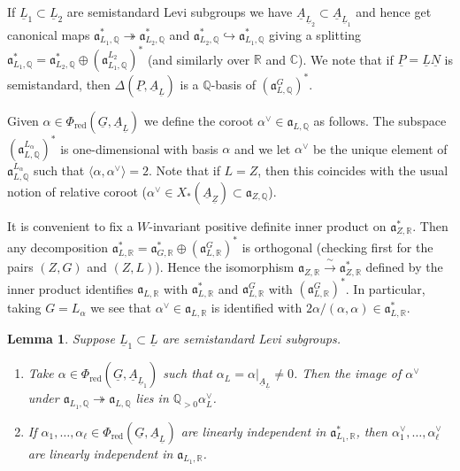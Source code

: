 \documentclass[a4paper]{amsart}
\numberwithin{equation}{section}
\newtheorem{lem}[thm]{Lemma}
\theoremstyle{remark}
\theoremstyle{definition}
\newcommand{\C}{\mathbb{C}}
\newcommand{\Q}{\mathbb{Q}}
\newcommand{\R}{\mathbb{R}}
\newcommand{\alggrp}[1]{\underline{#1}}
\newcommand{\ang}[1]{\langle #1\rangle}
\newcommand{\congto}{\xrightarrow{\,\sim\,}}
\begin{document}
If $\alggrp{L}_1 \subset \alggrp{L}_2$ are semistandard Levi subgroups we have $\alggrp{A}_{\alggrp{L}_2} \subset \alggrp{A}_{\alggrp{L}_1}$ and hence get canonical maps
$\mathfrak{a}_{L_1,\Q}^* \twoheadrightarrow \mathfrak{a}_{L_2,\Q}^*$ and $\mathfrak{a}_{L_2,\Q}^* \hookrightarrow \mathfrak{a}_{L_1,\Q}^*$ giving a splitting $\mathfrak{a}_{L_1,\Q}^* = \mathfrak{a}_{L_2,\Q}^* \oplus (\mathfrak{a}^{L_2}_{L_1,\Q})^*$
(and similarly over $\R$ and $\C$).
We note that if $\alggrp{P} = \alggrp{L}\alggrp{N}$ is semistandard, then $\Delta(\alggrp{P},\alggrp{A}_{\alggrp{L}})$ is a $\Q$-basis of $(\mathfrak{a}_{L,\Q}^G)^*$.

Given $\alpha \in \Phi_{\mathrm{red}}(\alggrp G, \alggrp A_{\alggrp L})$ we define the coroot $\alpha^{\vee} \in \mathfrak{a}_{L,\Q}$ as follows.
The subspace $(\mathfrak{a}_{L,\Q}^{L_\alpha})^*$ is one-dimensional with basis $\alpha$ and we let $\alpha^\vee$
be the unique element of $\mathfrak{a}_{L,\Q}^{L_\alpha}$ such that $\ang{\alpha,\alpha^{\vee}} = 2$.
Note that if $L = Z$, then this coincides with the usual notion of relative coroot ($\alpha^{\vee} \in X_*(\alggrp A_{\alggrp Z}) \subset \mathfrak{a}_{Z,\Q}$).

It is convenient to fix a $W$-invariant positive definite inner product on $\mathfrak{a}_{Z,\R}^*$. Then any decomposition $\mathfrak{a}_{L,\R}^* = \mathfrak{a}_{G,\R}^* \oplus (\mathfrak{a}_{L,\R}^G)^*$ is orthogonal (checking first for the pairs $(Z,G)$ and $(Z,L)$). Hence the isomorphism $\mathfrak{a}_{Z,\R} \congto \mathfrak{a}_{Z,\R}^*$ defined by the inner product identifies $\mathfrak{a}_{L,\R}$ with $\mathfrak{a}_{L,\R}^*$ and $\mathfrak{a}_{L,\R}^G$ with $(\mathfrak{a}_{L,\R}^G)^*$. In particular, taking $G = L_\alpha$ we see that $\alpha^{\vee} \in \mathfrak{a}_{L,\R}$ is identified with $2\alpha/(\alpha,\alpha) \in \mathfrak{a}_{L,\R}^*$.

\begin{lem}\label{lm:coroots}
  Suppose $\alggrp L_{1} \subset \alggrp L$ are semistandard Levi subgroups. 

  \begin{enumerate}
  \item Take $\alpha \in \Phi_{\mathrm{red}}(\alggrp G, \alggrp A_{\alggrp L_{1}})$ such that
    $\alpha_{L} = \alpha|_{\alggrp A_{\alggrp L}} \ne 0$.  Then the image of $\alpha^{\vee}$ under $\mathfrak{a}_{L_{1},\Q} \twoheadrightarrow \mathfrak{a}_{L,\Q}$ lies in
    $\Q_{>0}\alpha_{L}^{\vee}$.
  \item If $\alpha_1,\dots,\alpha_\ell \in \Phi_{\mathrm{red}}(\alggrp G, \alggrp A_{\alggrp L})$ are linearly independent in $\mathfrak{a}_{L_{1},\R}^*$, then $\alpha_1^{\vee},\dots,\alpha_\ell^{\vee}$
    are linearly independent in $\mathfrak{a}_{L_{1},\R}$.
  \end{enumerate}  
\end{lem}
\end{document}
